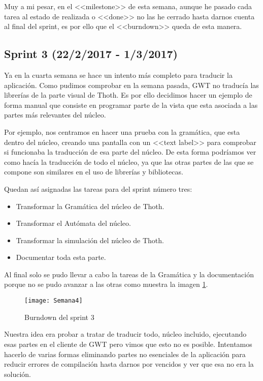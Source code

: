 Muy a mi pesar, en el <<milestone>> de esta semana, aunque he pasado cada tarea al estado de realizada o <<done>> no las he cerrado hasta darnos cuenta al final del sprint, es por ello que el <<burndown>> queda de esta manera.


\subsection{Sprint 3 (22/2/2017 - 1/3/2017)}

Ya en la cuarta semana se hace un intento más completo para traducir la aplicación. Como pudimos comprobar en la semana pasada, GWT no traducía las librerías de la parte visual de Thoth. Es por ello decidimos hacer un ejemplo de forma manual que consiste en programar parte de la vista que esta asociada a las partes más relevantes del núcleo.

Por ejemplo, nos centramos en hacer una prueba con la gramática, que esta dentro del núcleo, creando una pantalla con un <<text label>> para comprobar si funcionaba la traducción de esa parte del núcleo. De esta forma podríamos ver como hacía la traducción de todo el núcleo, ya que las otras partes de las que se compone son similares en el uso de librerías y bibliotecas.

Quedan así asignadas las tareas para del sprint número tres:

\begin{itemize}
\item Transformar la Gramática del núcleo de Thoth.
\item Transformar el Autómata del núcleo.
\item Transformar la simulación del núcleo de Thoth.
\item Documentar toda esta parte.
\end{itemize}

Al final solo se pudo llevar a cabo la tareas de la Gramática y la documentación porque no se pudo avanzar a las otras como muestra la imagen \ref{fig:A.2}.

\begin{figure}[h]
\centering
\texttt{[image: Semana4]}
\caption{Burndown del sprint 3}
\label{fig:A.2}
\end{figure}

 Nuestra idea era probar a tratar de traducir todo, núcleo incluido, ejecutando esas partes en el cliente de GWT  pero vimos que esto no es posible. Intentamos hacerlo de varias formas eliminando partes no esenciales de la aplicación para reducir errores de compilación hasta darnos por vencidos y ver que esa no era la solución.

